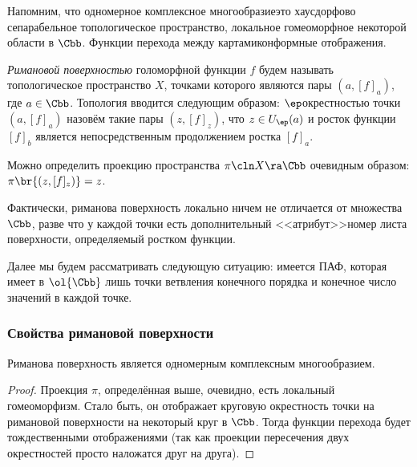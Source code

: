 \documentclass[a4paper]{article}
\begin{document}
Напомним, что одномерное комплексное многообразие\т это хаусдорфово сепарабельное топологическое пространство,
локальное гомеоморфное некоторой области в $\Cbb$. Функции перехода между картами\т конформные отображения.

\begin{df}
\emph{Римановой поверхностью} голоморфной функции $f$ будем называть топологическое пространство $X$,
точками которого являются пары $(a, [f]_a)$, где $a \in \Cbb$. Топология вводится следующим образом:
$\ep$\д окрестностью точки $(a, [f]_a)$ назовём такие пары $(z, [f]_z)$, что $z \in U_\ep(a)$ и
росток функции $[f]_b$ является непосредственным продолжением ростка $[f]_a$.
\end{df}

Можно определить проекцию пространства $\pi\cln X \ra \Cbb$ очевидным образом: $\pi\br{(z,[f]_z)} = z$.

Фактически, риманова поверхность локально ничем не отличается от множества $\Cbb$, разве что у каждой точки
есть дополнительный <<атрибут>>\т номер листа поверхности, определяемый ростком функции.


Далее мы будем рассматривать следующую ситуацию: имеется ПАФ, которая имеет в $\ol{\Cbb}$ лишь точки
ветвления конечного порядка и конечное число значений в каждой точке.

\subsubsection{Свойства римановой поверхности}

\begin{theorem}
Риманова поверхность является одномерным комплексным многообразием.
\end{theorem}
\begin{proof}
Проекция $\pi$, определённая выше, очевидно, есть локальный гомеоморфизм. Стало быть, он отображает
круговую окрестность точки на римановой поверхности на некоторый круг в $\Cbb$. Тогда функции перехода
будет тождественными отображениями (так как проекции пересечения двух окрестностей просто наложатся друг на друга).
\end{proof}
\end{document}
